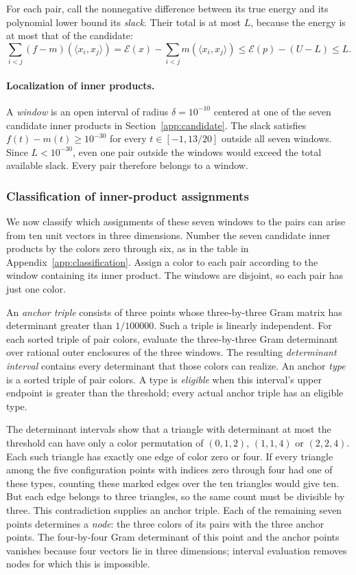 \documentclass[11pt]{article}
\newcommand{\E}{\mathcal{E}}
\begin{document}
For each pair, call the nonnegative difference between its true energy
and its polynomial lower bound its \emph{slack}. Their total is at most
$L$, because the energy is at most that of the candidate:
\[
 \sum_{i<j}(f-m)(\langle x_i,x_j\rangle)
 =\E(x)-\sum_{i<j}m(\langle x_i,x_j\rangle)
 \leq\E(p)-(U-L)\leq L.
\]
\paragraph{Localization of inner products.}
A \emph{window} is an open interval of radius $\delta=10^{-10}$ centered
at one of the seven candidate inner products in Section~\ref{app:candidate}. The slack satisfies $f(t)-m(t)\geq10^{-30}$
for every $t\in[-1,13/20]$ outside all seven windows. Since $L<10^{-30}$,
even one pair outside the windows would exceed the total available
slack. Every pair therefore belongs to a window.

\subsubsection{Classification of inner-product assignments}
We now classify which assignments of these seven windows to the pairs
can arise from ten unit vectors in three dimensions.
Number the seven candidate inner products by the colors zero through
six, as in the table in Appendix~\ref{app:classification}. Assign a color to each pair
according to the window containing its inner product.  The windows are
disjoint, so each pair has just one color.

An \emph{anchor triple} consists of three points whose three-by-three
Gram matrix has determinant greater than $1/100000$. Such a triple is
linearly independent.
For each sorted triple of pair colors, evaluate
the three-by-three Gram determinant over rational outer enclosures of
the three windows. The resulting \emph{determinant interval} contains
every determinant that those colors can realize. An anchor \emph{type}
is a sorted triple of pair colors. A type is
\emph{eligible} when this interval's upper endpoint is greater than the
threshold; every actual anchor triple has an eligible type.

The determinant intervals show that a
triangle with determinant at most the threshold can have only a color
permutation of $(0,1,2)$, $(1,1,4)$ or $(2,2,4)$. Each such triangle has
exactly one edge of color zero or four. If every triangle among the
five configuration points with indices zero through four had one of
these types, counting these marked edges over the ten triangles would
give ten. But each edge belongs to three triangles, so the same count
must be divisible by three. This contradiction supplies an anchor triple.
Each of the remaining seven points determines a \emph{node}: the three
colors of its pairs with the three anchor points. The four-by-four Gram
determinant of this point and the anchor points vanishes because four
vectors lie in three dimensions; interval evaluation removes nodes for
which this is impossible.
\end{document}

